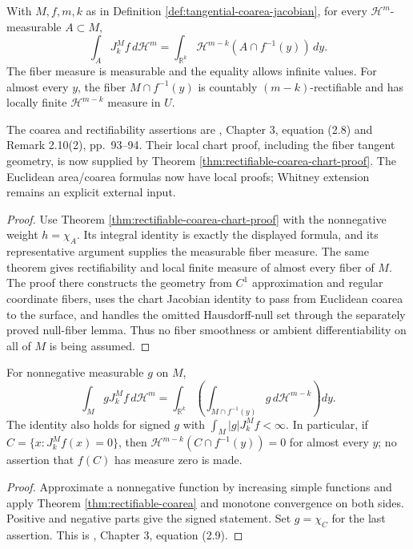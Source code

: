 \begin{theorem}\label{thm:rectifiable-coarea}
With $M,f,m,k$ as in Definition \ref{def:tangential-coarea-jacobian}, for every $\mathcal H^m$-measurable $A\subset M$,
\[
 \int_A J^M_k f\,d\mathcal H^m
 =\int_{\mathbb R^k}\mathcal H^{m-k}(A\cap f^{-1}(y))\,dy.
\]
The fiber measure is measurable and the equality allows infinite values. For almost every $y$, the fiber $M\cap f^{-1}(y)$ is countably $(m-k)$-rectifiable and has locally finite $\mathcal H^{m-k}$ measure in $U$.

The coarea and rectifiability assertions are \cite{Sim18}, Chapter 3, equation (2.8) and Remark 2.10(2), pp.~93--94. Their local chart proof, including the fiber tangent geometry, is now supplied by Theorem \ref{thm:rectifiable-coarea-chart-proof}. The Euclidean area/coarea formulas now have local proofs; Whitney extension remains an explicit external input.
\end{theorem}
\begin{proof}
Use Theorem \ref{thm:rectifiable-coarea-chart-proof} with the nonnegative weight $h=\chi_A$. Its integral identity is exactly the displayed formula, and its representative argument supplies the measurable fiber measure. The same theorem gives rectifiability and local finite measure of almost every fiber of $M$. The proof there constructs the geometry from $C^1$ approximation and regular coordinate fibers, uses the chart Jacobian identity to pass from Euclidean coarea to the surface, and handles the omitted Hausdorff-null set through the separately proved null-fiber lemma. Thus no fiber smoothness or ambient differentiability on all of $M$ is being assumed.
\end{proof}

\begin{corollary}\label{cor:weighted-rectifiable-coarea}
For nonnegative measurable $g$ on $M$,
\[
 \int_M gJ^M_kf\,d\mathcal H^m
 =\int_{\mathbb R^k}\left(\int_{M\cap f^{-1}(y)}g\,d\mathcal H^{m-k}\right)dy.
\]
The identity also holds for signed $g$ with $\int_M|g|J^M_kf<\infty$. In particular, if $C=\{x:J^M_kf(x)=0\}$, then $\mathcal H^{m-k}(C\cap f^{-1}(y))=0$ for almost every $y$; no assertion that $f(C)$ has measure zero is made.
\end{corollary}
\begin{proof}
Approximate a nonnegative function by increasing simple functions and apply Theorem \ref{thm:rectifiable-coarea} and monotone convergence on both sides. Positive and negative parts give the signed statement. Set $g=\chi_C$ for the last assertion. This is \cite{Sim18}, Chapter 3, equation (2.9).
\end{proof}

